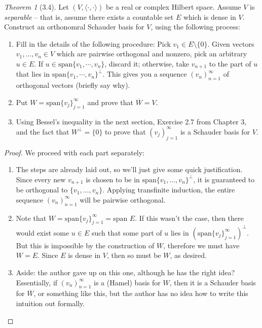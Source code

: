 \documentclass[12pt]{article}
\theoremstyle{remark}
\theoremstyle{named}
\newtheorem*{theorem}{Theorem}
\begin{document}
\begin{theorem}[3.4]
    Let \((V, \langle \cdot, \cdot \rangle)\) be a real or complex Hilbert space. Assume \(V\) is \textit{separable} -- that is, assume there exists a countable set \(E\) which is dense in \(V\). Construct an orthonomral Schauder basis for \(V\), using the following process:
    \begin{enumerate}
        \item Fill in the details of the following procedure: Pick \(v_1 \in E \setminus \{0\}\). Given vectors \(v_1, \ldots, v_n \in V\) which are pairwise orthogonal and nonzero, pick an arbitrary \(u \in E\). If \(u \in \text{span}\{v_1, \cdots, v_n\}\), discard it; 
        otherwise, take \(v_{n + 1}\) to the part of \(u\) that lies in \(\text{span}\{v_1, \cdots, v_n\}^\perp\). This gives you a sequence \((v_n)_{n = 1}^\infty\) of orthogonal vectors (briefly say why).
        \item Put \(W = \text{span}\{v_j\}_{j = 1}^\infty\) and prove that \(\overline W = V\). 
        \item Using Bessel's inequality in the next section, Exercise 2.7 from Chapter 3, and the fact that \(W^\perp = \{0\}\) to prove that \((v_j)_{j = 1}^\infty\) is a Schauder basis for \(V\).
    \end{enumerate}
\end{theorem}

\begin{proof}
    We proceed with each part separately:
    \begin{enumerate}
        \item The steps are already laid out, so we'll just give some quick justification. Since every new \(v_{n + 1}\) is chosen to be in \(\text{span}\{v_1, \ldots, v_n\}^\perp\), it is guaranteed to be orthogonal to \(\{v_1, \ldots, v_n\}\). Applying transfinite induction, the entire sequence \((v_n)_{n = 1}^\infty\) will be pairwise orthogonal. 
        
        \item Note that \(W = \text{span} \{ v_j \}_{j = 1}^\infty = \text{span } E\). If this wasn't the case, then there would exist some \(u \in E\) such that some part of \(u\) lies in \((\text{span} \{ v_j \}_{j = 1}^\infty)^\perp\). But this is impossible by the construction of \(W\), therefore we must have \(W = E\). Since \(E\) is dense in \(V\), then so must be \(W\), as desired.
        
        \item Aside: the author gave up on this one, although he has the right idea? Essentially, if \((v_n)_{n = 1}^\infty\) is a (Hamel) basis for \(W\), then it is a Schauder basis for \(\overline W\), or something like this, but the author has no idea how to write this intuition out formally.
    \end{enumerate}
\end{proof}
\end{document}
